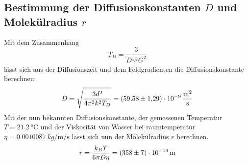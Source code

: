 \subsection{Bestimmung der Diffusionskonstanten $D$ und Molekülradius $r$}
Mit dem Zusammenhang 
\begin{equation*}
    T_D = \frac{3}{D \gamma^2 G^2}
\end{equation*}
lässt sich aus der Diffusionszeit und dem Feldgradienten die Diffusionskonstante berechnen:
\begin{equation*}
    D = \sqrt{\frac{3d^2}{4\pi^2k^2T_D}} = \SI{59.58 +- 1.29 E-09}{\metre \squared  \per \second}
\end{equation*}
Mit der nun bekannten Diffusionskonstante, der gemessenen Temperatur $T = \SI{21.2}{\celsius}$ und der Viskosität von Wasser bei raumtemperatur $\eta = \SI{0.0010087}{kg\per\metre\per\second}$ lässt sich nun der Molekülradius $r$ berechnen.
\begin{equation*}
    r = \frac{k_B T}{6\pi D \eta} = \SI{358 +- 7 E-14}{\metre}
\end{equation*}

